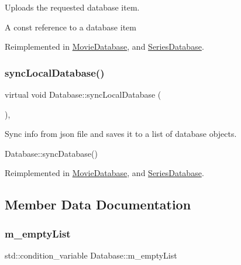 Uploads the requested database item. 

A const reference to a database item

Reimplemented in \hyperlink{classMovieDatabase_a203b9b5c1b325997ce519859a436b6ce}{Movie\+Database}, and \hyperlink{classSeriesDatabase_a7591f89ab256d9f5a41235f5552e4e23}{Series\+Database}.

\mbox{\label{classDatabase_a14d24487b4ea3b50097b9ac0f2b3f317}} 
\subsubsection{\texorpdfstring{sync\+Local\+Database()}{syncLocalDatabase()}}
{\footnotesize\ttfamily virtual void Database\+::sync\+Local\+Database (\begin{DoxyParamCaption}{ }\end{DoxyParamCaption})\hspace{0.3cm}{\ttfamily [inline]}, {\ttfamily [virtual]}}



Sync info from json file and saves it to a list of database objects. 

Database\+::sync\+Database() 

Reimplemented in \hyperlink{classMovieDatabase_aee175db6a2a357b6180fcab5d57eddd5}{Movie\+Database}, and \hyperlink{classSeriesDatabase_a0ba159b6d52a3cfa07135c7d8b37ef76}{Series\+Database}.



\subsection{Member Data Documentation}
\mbox{\label{classDatabase_a2ad8bf38964b3e18a0e168437acbdb27}} 
\subsubsection{\texorpdfstring{m\+\_\+empty\+List}{m\_emptyList}}
{\footnotesize\ttfamily std\+::condition\+\_\+variable Database\+::m\+\_\+empty\+List\hspace{0.3cm}{\ttfamily [protected]}}



